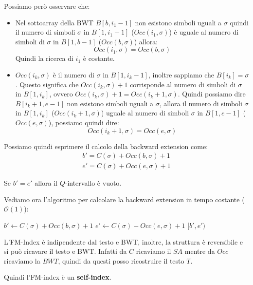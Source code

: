Possiamo però osservare che:
\begin{itemize}
    \item Nel sottoarray della BWT $B[b,i_1-1]$ non esistono simboli uguali a $\sigma$ quindi il numero
          di simboli $\sigma$ in $B[1,i_1-1]$ ($Occ(i_1,\sigma)$) è uguale al numero
          di simboli di $\sigma$  in $B[1,b-1]$ ($Occ(b,\sigma)$) allora:
          \begin{equation}
              Occ(i_1,\sigma) = Occ(b,\sigma)
          \end{equation}
          Quindi la ricerca di $i_1$ è costante.
    \item $Occ(i_k,\sigma)$ è il numero di $\sigma$ in $B[1,i_k-1]$, inoltre
          sappiamo che $B[i_k]=\sigma$. Questo significa che $Occ(i_k,\sigma) + 1 $
          corrisponde al numero di simboli di $\sigma$ in $B[1,i_k]$, ovvero
          $ Occ(i_k ,\sigma)+1= Occ(i_k + 1,\sigma)$.
          Quindi possiamo dire $B[i_k + 1, e - 1]$ non esistono simboli uguali a $\sigma$,
          allora il numero di simboli $\sigma$ in $B[1, i_k]$ ($Occ(i_k + 1,
              \sigma)$) uguale al numero di simboli $\sigma$ in $B[1, e - 1]$ ($ Occ(e, \sigma)$),
          possiamo quindi dire:
          \begin{equation}
              Occ(i_k + 1, \sigma) = Occ(e, \sigma)
          \end{equation}
\end{itemize}
Possiamo quindi esprimere il calcolo della backward extension come:
\begin{equation}
    \begin{array}{c}
        b' = C(\sigma) + Occ(b, \sigma) + 1 \\
        e' = C(\sigma) + Occ(e, \sigma) + 1
    \end{array}
\end{equation}
\begin{nota}
    Se $b' = e'$ allora il $Q$-intervallo è vuoto.
\end{nota}
Vediamo ora l'algoritmo per calcolare la backward extension in tempo costante
($\mathcal{O}(1)$):
\begin{algorithm}
    \begin{algorithmic}
        \State $b' \gets C(\sigma) + Occ(b, \sigma) + 1$
        \State $e' \gets C(\sigma) + Occ(e, \sigma) + 1$
        \State \Return $[b', e')$
        \EndFunction
    \end{algorithmic}
\end{algorithm}
\begin{nota}
    L'FM-Index è indipendente dal testo e BWT, inoltre, la struttura è reversibile
    e si può ricavare il testo e BWT. Infatti da $C$ ricaviamo il $SA$ mentre da $Occ$
    ricaviamo la $BWT$, quindi da questi posso ricostruire il testo $T$.

    Quindi l'FM-index è un \textbf{self-index}.
\end{nota}

